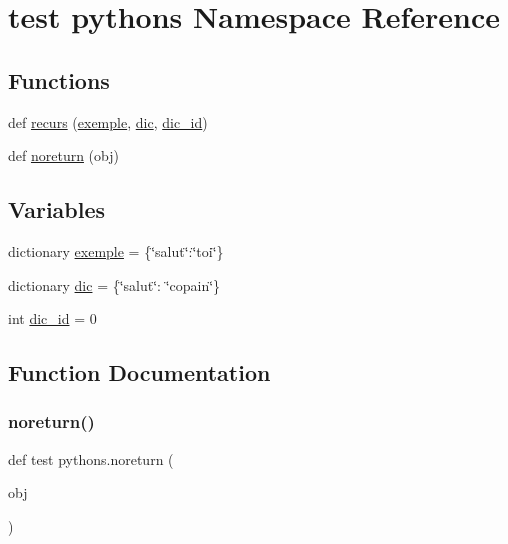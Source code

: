 \hypertarget{namespacetest_01pythons}{}\section{test pythons Namespace Reference}
\label{namespacetest_01pythons}
\subsection*{Functions}
\begin{DoxyCompactItemize}
\item 
def \hyperlink{namespacetest_01pythons_a47729b63dec1d2009dac659f3799e58d}{recurs} (\hyperlink{namespacetest_01pythons_a8e0bfabcfdd19185e780cd2061449b37}{exemple}, \hyperlink{namespacetest_01pythons_a5ee650aa154d3ad769048fb3962bd863}{dic}, \hyperlink{namespacetest_01pythons_a1b2b80b8dfe0ff2a6dd68f854342c9c5}{dic\+\_\+id})
\item 
def \hyperlink{namespacetest_01pythons_ad81e985019f76816eb5e41aa7aa5503e}{noreturn} (obj)
\end{DoxyCompactItemize}
\subsection*{Variables}
\begin{DoxyCompactItemize}
\item 
dictionary \hyperlink{namespacetest_01pythons_a8e0bfabcfdd19185e780cd2061449b37}{exemple} = \{\char`\"{}salut\char`\"{}\+:\char`\"{}toi\char`\"{}\}
\item 
dictionary \hyperlink{namespacetest_01pythons_a5ee650aa154d3ad769048fb3962bd863}{dic} = \{\char`\"{}salut\char`\"{}\+: \char`\"{}copain\char`\"{}\}
\item 
int \hyperlink{namespacetest_01pythons_a1b2b80b8dfe0ff2a6dd68f854342c9c5}{dic\+\_\+id} = 0
\end{DoxyCompactItemize}


\subsection{Function Documentation}
\mbox{\label{namespacetest_01pythons_ad81e985019f76816eb5e41aa7aa5503e}} 
\subsubsection{\texorpdfstring{noreturn()}{noreturn()}}
{\footnotesize\ttfamily def test pythons.\+noreturn (\begin{DoxyParamCaption}\item[{}]{obj }\end{DoxyParamCaption})}



